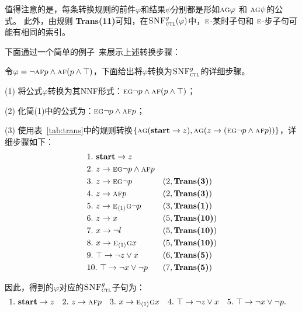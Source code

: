值得注意的是，每条转换规则的前件$\varphi$和结果$\psi$分别都是形如$\textsc{a}\textsc{g}\varphi$ 和 $\textsc{a}\textsc{g}\psi$的公式。
此外，由规则 \textbf{Trans(11)}可知，在${\textsc{SNF}_{\textsc{ctl}}^g}(\varphi)$中，$\textsc{e}$-某时子句和 $\textsc{e}$-步子句可能有相同的索引。


下面通过一个简单的例子~\cite{zhang2014resolution}来展示上述转换步骤：
\begin{example}\label{exmp:transbot}
	令$\varphi=\neg \textsc{a} \textsc{f} p \wedge \textsc{a}\textsc{f}(p \wedge \top)$，下面给出将$\varphi$转换为${\textsc{SNF}_{\textsc{ctl}}^g}$的详细步骤。
	
	(1) 将公式$\varphi$转换为其NNF形式：$\textsc{e}\textsc{g} \neg p \wedge \textsc{a}\textsc{f}(p \wedge \top)$；
	
	(2) 化简(1)中的公式为：$\textsc{e}\textsc{g} \neg p \wedge \textsc{a}\textsc{f} p$；
	
	(3) 使用表~\ref{tab:trans}中的规则转换$\{\textsc{a}\textsc{g}(\textbf{start} \rightarrow z), \textsc{a}\textsc{g}(z \rightarrow (\textsc{e}\textsc{g} \neg p \wedge \textsc{a}\textsc{f} p))\}$，详细步骤如下：
	\begin{align*}
		&1.\ \textbf{start} \rightarrow z && \\
		&2.\ z \rightarrow \textsc{e}\textsc{g} \neg p \wedge \textsc{a}\textsc{f} p &&  \\
		&3.\ z \rightarrow  \textsc{e}\textsc{g} \neg p && (2, \textbf{Trans(3)})\\
		&4.\ z \rightarrow \textsc{a}\textsc{f} p && (2, \textbf{Trans(3)})\\
		&5.\ z \rightarrow  \textsc{e}_{{\langle{1}\rangle}}\textsc{g} \neg p  && (3, \textbf{Trans(1)})\\
		&6.\ z \rightarrow x && (5, \textbf{Trans(10)})\\
		&7.\ x\rightarrow \neg l && (5, \textbf{Trans(10)})\\
		&8.\ x\rightarrow \textsc{e}_{{\langle{1}\rangle}} \textsc{g} x&& (5, \textbf{Trans(10)})\\
		&9.\ \top \rightarrow \neg z \vee x && (6, \textbf{Trans(5)}) \\
		&10.\ \top \rightarrow \neg x \vee \neg p && (7, \textbf{Trans(5)}) 
	\end{align*}

因此，得到的$\varphi$对应的${\textsc{SNF}_{\textsc{ctl}}^g}$子句为：
\begin{align*}
	&1.\ \textbf{start} \rightarrow z && 2.\ z \rightarrow \textsc{a}\textsc{f} p && 3.\ x\rightarrow \textsc{e}_{{\langle{1}\rangle}} \textsc{g} x
	&& 4.\ \top \rightarrow \neg z \vee x && 5.\ \top \rightarrow \neg x \vee \neg p.
\end{align*}
\end{example}






